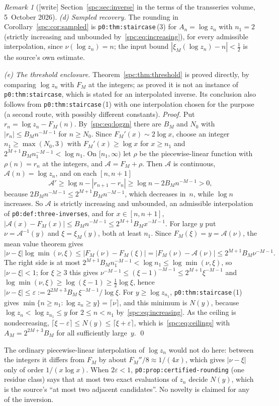 \documentclass[11pt,letterpaper]{article}
\theoremstyle{definition}\newtheorem{definition}[theorem]{Definition}
\theoremstyle{remark}\newtheorem{remark}[theorem]{Remark}
\newcommand{\file}[1]{\nolinkurl{#1}}
\begin{document}
\begin{remark}[{[write]} Section~\ref{spc:sec:inverse} in the terms of the transseries volume, 5~October 2026]
\emph{(d) Sampled recovery.} The rounding in
Corollary~\ref{spc:cor:sampled} is \file{p0:thm:staircase}\,(3) for $A_n=\log z_n$ with $n_1=2$ (strictly
increasing and unbounded by~\eqref{spc:eq:increasing}), for every admissible
interpolation, since $\nu(\log z_n)=n$; the input bound
$|\xi_M(\log z_n)-n|<\tfrac12$ is the source's own estimate.

\emph{(e) The threshold enclosure.} Theorem~\ref{spc:thm:threshold} is
proved directly, by comparing
$\log z_n$ with $F_M$ at the integers; as proved it is not an instance of
\file{p0:thm:staircase}, which is stated for an interpolated inverse. Its
conclusion also follows from \file{p0:thm:staircase}\,(1) with one
interpolation chosen for the purpose (a second route, with possibly different
constants). \emph{Proof.} Put $r_n=\log z_n-F_M(n)$. By~\eqref{spc:eq:logzn}
there are $B_M$ and $N_0$ with $|r_n|\le B_Mn^{-M-1}$ for $n\ge N_0$. Since
$F_M'(x)\sim2\log x$, choose an integer $n_1\ge\max(N_0,3)$ with
$F_M'(x)\ge\log x$ for $x\ge n_1$ and $2^{M+1}B_Mn_1^{-M-1}<\log n_1$. On
$[n_1,\infty)$ let $\rho$ be the piecewise-linear function with $\rho(n)=r_n$
at the integers, and $\mathcal A=F_M+\rho$. Then $\mathcal A$ is continuous,
$\mathcal A(n)=\log z_n$, and on each $[n,n+1]$
\[
 \mathcal A'\ge\log n-|r_{n+1}-r_n|\ge\log n-2B_Mn^{-M-1}>0,
\]
because $2B_Mn^{-M-1}\le2^{M+1}B_Mn^{-M-1}$, which decreases in~$n$, while
$\log n$ increases. So $\mathcal A$ is strictly increasing and unbounded, an
admissible interpolation of \file{p0:def:three-inverses}, and for
$x\in[n,n+1]$, $|\mathcal A(x)-F_M(x)|\le B_Mn^{-M-1}\le2^{M+1}B_Mx^{-M-1}$.
For large $y$ put $\nu=\mathcal A^{-1}(y)$ and $\xi=\xi_M(y)$, both at least
$n_1$. Since $F_M(\xi)=y=\mathcal A(\nu)$, the mean value theorem gives
\[
 |\nu-\xi|\log\min(\nu,\xi)\le|F_M(\nu)-F_M(\xi)|
 =|F_M(\nu)-\mathcal A(\nu)|\le2^{M+1}B_M\nu^{-M-1}.
\]
The right side is at most $2^{M+1}B_Mn_1^{-M-1}<\log n_1\le\log\min(\nu,\xi)$,
so $|\nu-\xi|<1$; for $\xi\ge3$ this
gives $\nu^{-M-1}\le(\xi-1)^{-M-1}\le2^{M+1}\xi^{-M-1}$ and
$\log\min(\nu,\xi)\ge\log(\xi-1)\ge\tfrac12\log\xi$, hence
$|\nu-\xi|\le\varepsilon:=2^{2M+3}B_M\,\xi^{-M-1}/\log\xi$. For
$y\ge\log z_{n_1}$, \file{p0:thm:staircase}\,(1) gives
$\min\{n\ge n_1:\log z_n\ge y\}=\lceil\nu\rceil$, and this minimum is $N(y)$,
because $\log z_n<\log z_{n_1}\le y$ for $2\le n<n_1$
by~\eqref{spc:eq:increasing}. As the ceiling is nondecreasing,
$\lceil\xi-\varepsilon\rceil\le N(y)\le\lceil\xi+\varepsilon\rceil$,
which is~\eqref{spc:eq:ceilings} with $A_M=2^{2M+3}B_M$ for all sufficiently
large~$y$. \qed

The ordinary piecewise-linear interpolation of $\log z_n$ would not do
here: between the integers it differs from $F_M$ by about
$F_M''/8\approx1/(4x)$, which gives $|\nu-\xi|$ only of order
$1/(x\log x)$. When $2\varepsilon<1$, \file{p0:prop:certified-rounding}
(one residue class) says that at most two exact evaluations of $z_n$ decide
$N(y)$, which is the source's ``at most two adjacent candidates''. No
novelty is claimed for any of the inversion.
\end{remark}
\end{document}
